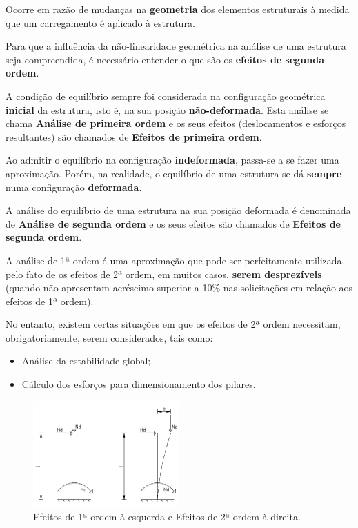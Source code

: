 Ocorre em razão de mudanças na \textbf{geometria} dos elementos estruturais à medida que um carregamento é aplicado à estrutura.

Para que a influência da não-linearidade geométrica na análise de uma estrutura seja compreendida, é necessário entender o que são os \textbf{efeitos de segunda ordem}.

A condição de equilíbrio sempre foi considerada na configuração geométrica \textbf{inicial} da estrutura, isto é, na sua posição \textbf{não-deformada}. Esta análise se chama \textbf{Análise de primeira ordem} e os seus efeitos (deslocamentos e esforços resultantes) são chamados de \textbf{Efeitos de primeira ordem}.

Ao admitir o equilíbrio na configuração \textbf{indeformada}, passa-se a se fazer uma aproximação. Porém, na realidade, o equilíbrio de uma estrutura se dá \textbf{sempre} numa configuração \textbf{deformada}.

A análise do equilíbrio de uma estrutura na sua posição deformada é denominada de \textbf{Análise de segunda ordem} e os seus efeitos são chamados de \textbf{Efeitos de segunda ordem}.

A análise de 1ª ordem é uma aproximação que pode ser perfeitamente utilizada pelo fato de os efeitos de 2ª ordem, em muitos casos, \textbf{serem desprezíveis} (quando não apresentam acréscimo superior a 10\% nas solicitações em relação aos efeitos de 1ª ordem).

No entanto, existem certas situações em que os efeitos de 2ª ordem necessitam, obrigatoriamente, serem considerados, tais como:

\begin{itemize}
	\item Análise da estabilidade global;
	\item Cálculo dos esforços para dimensionamento dos pilares.
\end{itemize}

\begin{figure}[H]
	\begin{center}
	\caption{Efeitos de 1ª ordem à esquerda e Efeitos de 2ª ordem à direita.}
    	\includegraphics[width=0.5\textwidth]{Nao-linearidade-geometrica/Imagens/Efeitos-de-1a-e-2a-ordem.png}
	\end{center}
\end{figure}